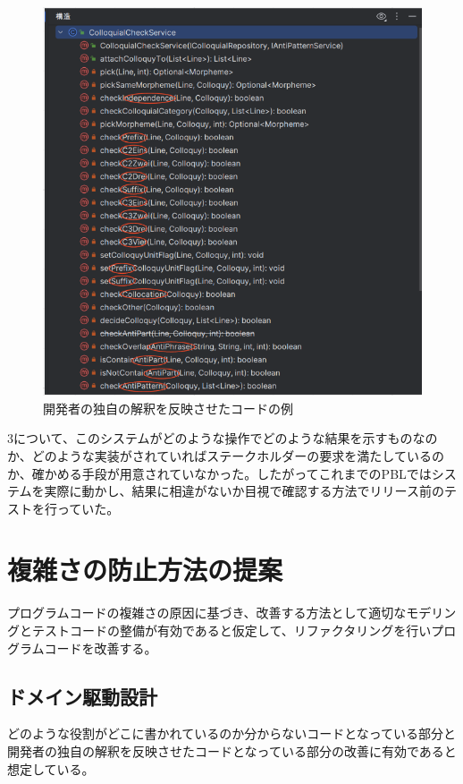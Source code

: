\documentclass[12pt, a4paper]{jreport}
\begin{document}
\begin{figure}[H]
\centering
\includegraphics[width=1\linewidth]{image/genin2.1.png}
\caption{開発者の独自の解釈を反映させたコードの例}
\label{fig:enter-label}
\end{figure}
3について、このシステムがどのような操作でどのような結果を示すものなのか、どのような実装がされていればステークホルダーの要求を満たしているのか、確かめる手段が用意されていなかった。したがってこれまでのPBLではシステムを実際に動かし、結果に相違がないか目視で確認する方法でリリース前のテストを行っていた。
\section{複雑さの防止方法の提案}
プログラムコードの複雑さの原因に基づき、改善する方法として適切なモデリングとテストコードの整備が有効であると仮定して、リファクタリングを行いプログラムコードを改善する。
\subsection{ドメイン駆動設計}
どのような役割がどこに書かれているのか分からないコードとなっている部分と開発者の独自の解釈を反映させたコードとなっている部分の改善に有効であると想定している。
\end{document}
